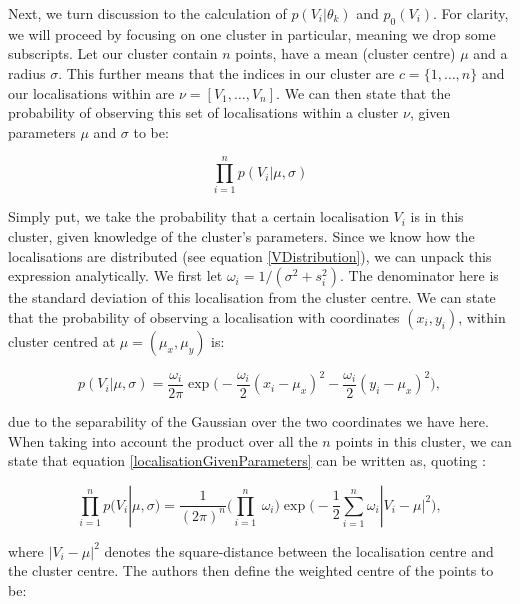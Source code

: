 \documentclass[11pt]{article}
\begin{document}
Next, we turn discussion to the calculation of $p(V_i | \theta_k)$ and  $p_0(V_i)$. For clarity, we will proceed by focusing on one cluster in particular, meaning we drop some subscripts. Let our cluster contain $n$ points, have a mean (cluster centre) $\mu$ and a radius $\sigma$. This further means that the indices in our cluster are $c = \{1, \dots, n\}$ and our localisations within are $\nu = [V_1, \dots, V_n]$. We can then state that the probability of observing this set of localisations within a cluster $\nu$, given parameters $\mu$ and $\sigma$ to be:

\begin{equation} \label{localisationGivenParameters}
	\underset{i = 1}{\overset{n}{\prod}} p(V_i | \mu, \sigma)
\end{equation}

Simply put, we take the probability that a certain localisation $V_i$ is in this cluster, given knowledge of the cluster's parameters. Since we know how the localisations are distributed (see equation \ref{VDistribution}), we can unpack this expression analytically.  
We first let $\omega_i = 1/ (\sigma^2 + s_i^2)$. The denominator here is the standard deviation of this localisation from the cluster centre. We can state that the probability of observing a localisation with coordinates $(x_i, y_i)$, within cluster centred at $\mu = (\mu_x, \mu_y)$ is:



\begin{equation}
	\label{pvGivenSigma}
p(V_i|\mu,\sigma)=
	\frac{\omega_i}{2\pi} \exp\Bigg(
	- \frac{\omega_i}{2}
	 (x_i - \mu_x)^2 - 
	 \frac{\omega_i}{2}(y_i - \mu_x)^2
	\Bigg),
\end{equation} 

due to the separability of the Gaussian over the two coordinates we have here. When taking into account the product over all the $n$ points in this cluster, we can state that equation \ref{localisationGivenParameters} can be written as, quoting \cite{Rubin-Delanchy2015}:

\begin{equation}
\underset{i = 1}{\overset{n}{\prod}} p(V_i | \mu, \sigma) = 
	\frac{1}{(2\pi)^n}
	 \Bigg( \underset{i = 1}{\overset{n}{\prod}} \ \omega_i
	 \Bigg)
	 \exp\Bigg(
	 -\frac{1}{2} \underset{i=1}{\overset{n}{
	 \sum	 	
}}	\omega_i |V_i - \mu|^2
	 \Bigg),
\end{equation}

where $|V_i - \mu|^2 $ denotes the square-distance between the localisation centre and the cluster centre. The authors then define the weighted centre of the points to be:
\end{document}
